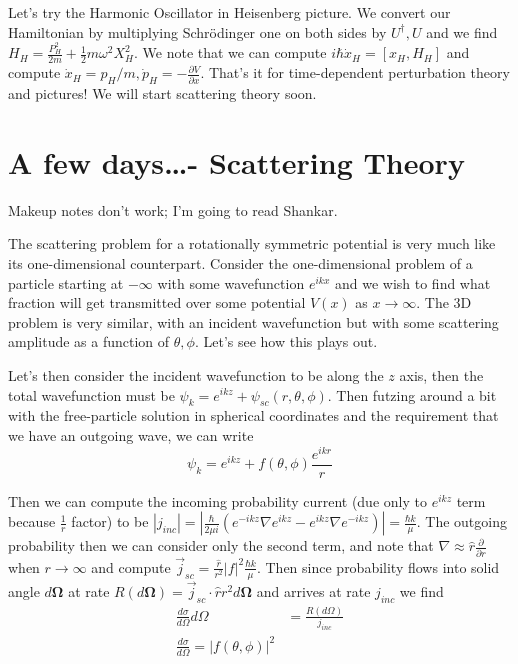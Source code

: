 \documentclass[10pt]{report}
\newcommand{\rd}[2]{\frac{d#1}{d#2}}
\newcommand{\pd}[2]{\frac{\partial #1}{\partial#2}}
\newcommand{\abs}[1]{\left|#1\right|}
\begin{document}
Let's try the Harmonic Oscillator in Heisenberg picture. We convert our Hamiltonian by multiplying Schr\"odinger one on both sides by $U^\dagger, U$ and we find $H_H = \frac{P_H^2}{2m} + \frac{1}{2}m\omega^2 X_H^2$. We note that we can compute $i\hbar\dot{x}_H = [x_H, H_H]$ and compute $\dot{x}_H = p_H/m, \dot{p}_H = -\pd{V}{x}$. That's it for time-dependent perturbation theory and pictures! We will start scattering theory soon. 

\chapter{A few days\dots - Scattering Theory}

Makeup notes don't work; I'm going to read Shankar.

The scattering problem for a rotationally symmetric potential is very much like its one-dimensional counterpart. Consider the one-dimensional problem of a particle starting at $-\infty$ with some wavefunction $e^{ikx}$ and we wish to find what fraction will get transmitted over some potential $V(x)$ as $x \to \infty$. The 3D problem is very similar, with an incident wavefunction but with some scattering amplitude as a function of $\theta,\phi$. Let's see how this plays out. 

Let's then consider the incident wavefunction to be along the $z$ axis, then the total wavefunction must be $\psi_k = e^{ikz} + \psi_{sc}(r,\theta,\phi)$. Then futzing around a bit with the free-particle solution in spherical coordinates and the requirement that we have an outgoing wave, we can write
\begin{equation}
    \psi_k = e^{ikz} + f(\theta,\phi)\frac{e^{ikr}}{r}
\end{equation}

Then we can compute the incoming probability current (due only to $e^{ikz}$ term because $\frac{1}{r}$ factor) to be $\abs{j_{inc}} = \abs{\frac{\hbar}{2\mu i}\left( e^{-ikz}\nabla e^{ikz} - e^{ikz}\nabla e^{-ikz} \right)} = \frac{\hbar k}{\mu}$. The outgoing probability then we can consider only the second term, and note that $\nabla \approx \hat{r}\pd{}{r}$ when $r \to \infty$ and compute $\vec{j}_{sc} = \frac{\hat{r}}{r^2}\abs{f}^2\frac{\hbar k}{\mu}$. Then since probability flows into solid angle $d\mathbf{\Omega}$ at rate $R(d\mathbf{\Omega}) = \vec{j}_{sc}\cdot \hat{r}r^2d\mathbf{\Omega}$ and arrives at rate $j_{inc}$ we find
\begin{align}
    \rd{\sigma}{\Omega}d\Omega &= \frac{R(d\Omega)}{j_{inc}}\\
    \rd{\sigma}{\Omega} = \abs{f(\theta,\phi)}^2
    \label{scat.timeD}
\end{align}
\end{document}
